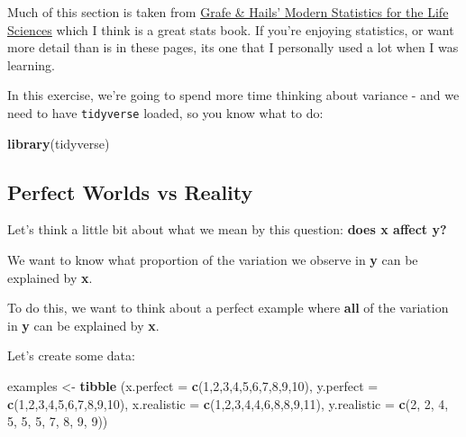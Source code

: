 \documentclass[
]{book}
\newenvironment{Shaded}{\begin{snugshade}}{\end{snugshade}}
\newcommand{\DataTypeTok}[1]{\textcolor[rgb]{0.13,0.29,0.53}{#1}}
\newcommand{\DecValTok}[1]{\textcolor[rgb]{0.00,0.00,0.81}{#1}}
\newcommand{\KeywordTok}[1]{\textcolor[rgb]{0.13,0.29,0.53}{\textbf{#1}}}
\newcommand{\NormalTok}[1]{#1}
\newcommand{\StringTok}[1]{\textcolor[rgb]{0.31,0.60,0.02}{#1}}
\begin{document}
Much of this section is taken from \href{https://global.oup.com/uk/orc/biosciences/maths/grafen/}{Grafe \& Hails' Modern Statistics for the Life Sciences} which I think is a great stats book. If you're enjoying statistics, or want more detail than is in these pages, its one that I personally used a lot when I was learning.

In this exercise, we're going to spend more time thinking about variance - and we need to have \texttt{tidyverse} loaded, so you know what to do:

\begin{Shaded}
\begin{Highlighting}[]
\KeywordTok{library}\NormalTok{(tidyverse)}
\end{Highlighting}
\end{Shaded}

\hypertarget{perfect-worlds-vs-reality}{%
\subsection{Perfect Worlds vs Reality}\label{perfect-worlds-vs-reality}}

Let's think a little bit about what we mean by this question: \textbf{does x affect y?}

We want to know what proportion of the variation we observe in \textbf{y} can be explained by \textbf{x}.

To do this, we want to think about a perfect example where \textbf{all} of the variation in \textbf{y} can be explained by \textbf{x}.

Let's create some data:

\begin{Shaded}
\begin{Highlighting}[]
\NormalTok{examples <-}\StringTok{ }\KeywordTok{tibble}\NormalTok{ (}\DataTypeTok{x.perfect =} \KeywordTok{c}\NormalTok{(}\DecValTok{1}\NormalTok{,}\DecValTok{2}\NormalTok{,}\DecValTok{3}\NormalTok{,}\DecValTok{4}\NormalTok{,}\DecValTok{5}\NormalTok{,}\DecValTok{6}\NormalTok{,}\DecValTok{7}\NormalTok{,}\DecValTok{8}\NormalTok{,}\DecValTok{9}\NormalTok{,}\DecValTok{10}\NormalTok{), }
                    \DataTypeTok{y.perfect =} \KeywordTok{c}\NormalTok{(}\DecValTok{1}\NormalTok{,}\DecValTok{2}\NormalTok{,}\DecValTok{3}\NormalTok{,}\DecValTok{4}\NormalTok{,}\DecValTok{5}\NormalTok{,}\DecValTok{6}\NormalTok{,}\DecValTok{7}\NormalTok{,}\DecValTok{8}\NormalTok{,}\DecValTok{9}\NormalTok{,}\DecValTok{10}\NormalTok{), }
                    \DataTypeTok{x.realistic =} \KeywordTok{c}\NormalTok{(}\DecValTok{1}\NormalTok{,}\DecValTok{2}\NormalTok{,}\DecValTok{3}\NormalTok{,}\DecValTok{4}\NormalTok{,}\DecValTok{4}\NormalTok{,}\DecValTok{6}\NormalTok{,}\DecValTok{8}\NormalTok{,}\DecValTok{8}\NormalTok{,}\DecValTok{9}\NormalTok{,}\DecValTok{11}\NormalTok{), }
                    \DataTypeTok{y.realistic =} \KeywordTok{c}\NormalTok{(}\DecValTok{2}\NormalTok{, }\DecValTok{2}\NormalTok{, }\DecValTok{4}\NormalTok{, }\DecValTok{5}\NormalTok{, }\DecValTok{5}\NormalTok{, }\DecValTok{5}\NormalTok{, }\DecValTok{7}\NormalTok{, }\DecValTok{8}\NormalTok{, }\DecValTok{9}\NormalTok{, }\DecValTok{9}\NormalTok{))}
\end{Highlighting}
\end{Shaded}
\end{document}
